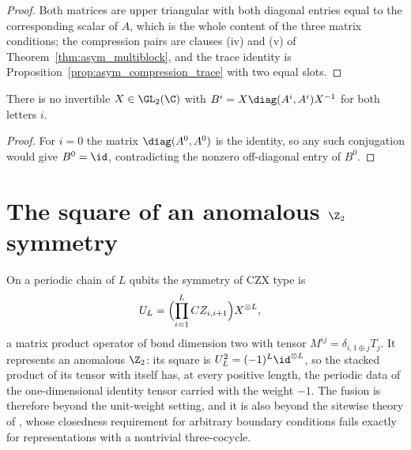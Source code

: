 \begin{proof}
    \leanok
    Both matrices are upper triangular with both diagonal entries equal to
    the corresponding scalar of $A$, which is the whole content of the three
    matrix conditions; the compression pairs are clauses (iv) and (v) of
    Theorem~\ref{thm:asym_multiblock}, and the trace identity is
    Proposition~\ref{prop:asym_compression_trace} with two equal slots.
\end{proof}

\begin{theorem}
    \label{thm:asymex_repeated_not_gauge}
    \leanok
    There is no invertible $X\in\GL_2(\C)$ with
    $B^i=X\diag(A^i,A^i)X^{-1}$ for both letters $i$.
\end{theorem}

\begin{proof}
    \leanok
    For $i=0$ the matrix $\diag(A^0,A^0)$ is the identity, so any such
    conjugation would give $B^0=\id$, contradicting the nonzero
    off-diagonal entry of $B^0$.
\end{proof}

\section{The square of an anomalous $\Z_2$ symmetry}%
\label{sec:asymex_czx}

On a periodic chain of $L$ qubits the symmetry of CZX type is
\begin{align}
    U_L & =\Bigl(\prod_{i=1}^{L}CZ_{i,i+1}\Bigr)X^{\otimes L},
    \label{eq:asymex_czx_operator}
\end{align}
a matrix product operator of bond dimension two with tensor
$M^{ij}=\delta_{i,1\oplus j}T_j$. It represents an anomalous $\Z_2$: its
square is $U_L^2=(-1)^L\id^{\otimes L}$, so the stacked product of its
tensor with itself has, at every positive length, the periodic data of the
one-dimensional identity tensor carried with the weight $-1$. The fusion is
therefore beyond the unit-weight setting, and it is also beyond the sitewise
theory of \cite[Appendix~A]{GarreRubio2023MPOSym}, whose closedness
requirement for arbitrary boundary conditions fails exactly for
representations with a nontrivial three-cocycle.

